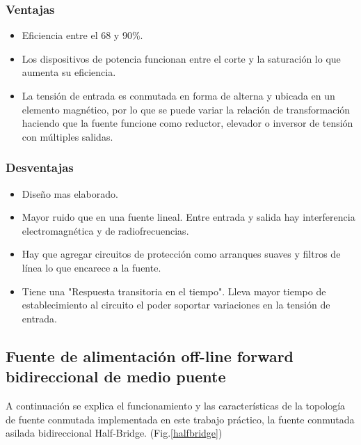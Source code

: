 \documentclass[11pt, a4paper]{article}
\begin{document}
\subsubsection{Ventajas}
\begin{itemize}
	\item Eficiencia entre el 68 y 90\%.
	\item Los dispositivos de potencia funcionan entre el corte y la saturación lo que aumenta su eficiencia.
	\item La tensión de entrada es conmutada en forma de alterna y ubicada en un elemento magnético, por lo que se puede variar la relación de transformación haciendo que la fuente funcione como reductor, elevador o inversor de tensión con múltiples salidas.
\end{itemize}
\subsubsection{Desventajas}
\begin{itemize}
	\item Diseño mas elaborado.
	\item Mayor ruido que en una fuente lineal. Entre entrada y salida hay interferencia electromagnética y de radiofrecuencias.
	\item Hay que agregar circuitos de protección como arranques suaves y filtros de línea lo que encarece a la fuente.
	\item Tiene una "Respuesta transitoria en el tiempo". Lleva mayor tiempo de establecimiento al circuito el poder soportar variaciones en la tensión de entrada.
\end{itemize}

\subsection{Fuente de alimentación off-line forward bidireccional de medio puente}
A continuación se explica el funcionamiento y las características de la topología de fuente conmutada implementada en este trabajo práctico, la fuente conmutada asilada bidireccional Half-Bridge. (Fig.\ref{halfbridge})
\end{document}
